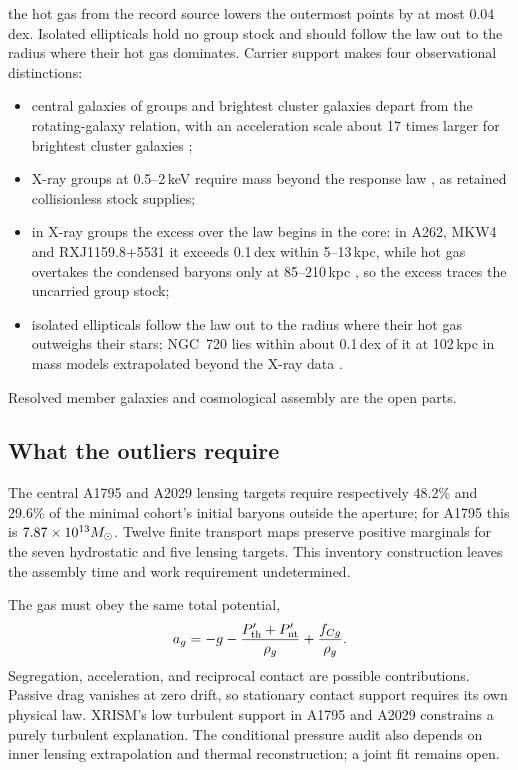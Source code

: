 the hot gas from the record source lowers the outermost points by at most
0.04\,dex. Isolated ellipticals hold no group stock and should follow the law
out to the radius where their hot gas dominates. Carrier support
makes four observational distinctions:
\begin{itemize}
\item central galaxies of groups and brightest cluster galaxies depart
from the rotating-galaxy relation, with an acceleration scale about
17 times larger for brightest cluster galaxies \cite{bcgrar,centralsrar};
\item X-ray groups at 0.5--2\,keV require mass beyond the response law
\cite{angus08}, as retained collisionless stock supplies;
\item in X-ray groups the excess over the law begins in the core: in A262,
MKW4 and RXJ1159.8+5531 it exceeds 0.1\,dex within 5--13\,kpc, while hot gas
overtakes the condensed baryons only at 85--210\,kpc
\cite{gastaldello07,vikhlinin06}, so the excess traces the uncarried group
stock;
\item isolated ellipticals follow the law out to the radius where their hot
gas outweighs their stars; NGC~720 lies within about 0.1\,dex of it at
102\,kpc in mass models extrapolated beyond the X-ray data \cite{humphrey11}.
\end{itemize}
Resolved member galaxies and cosmological assembly are the open parts.

\subsection{What the outliers require}
The central A1795 and A2029 lensing targets require respectively
48.2\% and 29.6\% of the minimal cohort's initial baryons outside the
aperture; for A1795 this is $7.87\times10^{13}M_\odot$. Twelve finite
transport maps preserve positive marginals for the seven hydrostatic
and five lensing targets. This inventory construction leaves the
assembly time and work requirement undetermined. 

The gas must obey the same total potential,
\begin{equation}
a_g=-g-\frac{P_{\rm th}'+P_{\rm nt}'}{\rho_g}+\frac{f_{Cg}}{\rho_g}.
\end{equation}
Segregation, acceleration, and reciprocal contact are possible contributions.
Passive drag vanishes at zero drift, so stationary contact support requires
its own physical law. XRISM's low turbulent support in A1795 and A2029
constrains a purely turbulent explanation. \cite{sarkarnew,xrismnew}
The conditional pressure audit also depends on inner lensing extrapolation
and thermal reconstruction; a joint fit remains open.

